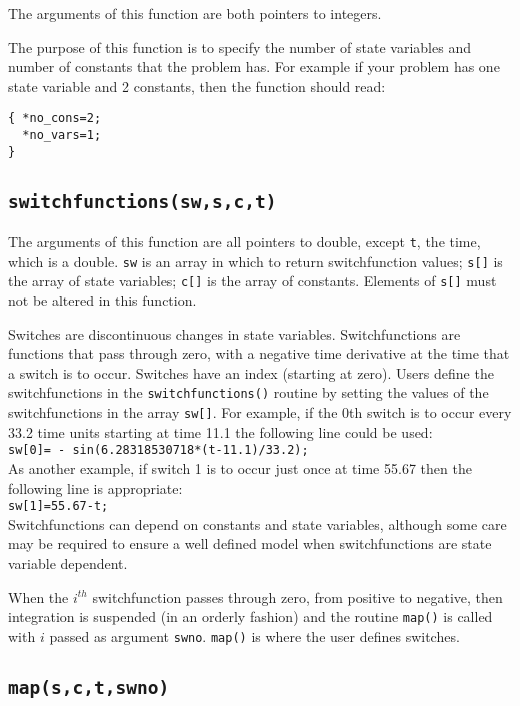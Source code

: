 \documentclass[10pt] {article}
\begin{document}
The arguments of this function are both pointers to integers.

The purpose of this function is to specify the number of state variables and number of constants %
that the problem has. For example if your problem has one state variable and 2 constants, then %
the function should read:
\begin{verbatim}
{ *no_cons=2;
  *no_vars=1;
}
\end{verbatim}

\subsection{\tt switchfunctions(sw,s,c,t)}

The arguments of this function are all pointers to double, except \verb+t+, the time, which is a %
double. \verb+sw+ is an array in which to return switchfunction values; \verb+s[]+ is the array %
of state variables; \verb+c[]+ is the array of constants. Elements of \verb+s[]+ must not be %
altered in this function.

Switches are discontinuous changes in state variables. Switchfunctions are functions that pass %
through zero, with a negative time derivative at the time that a switch is to occur. Switches %
have an index (starting at zero). Users define the switchfunctions in the %
\verb+switchfunctions()+ routine by setting the values of the switchfunctions in the array %
\verb+sw[]+. For example, if the 0th switch is to occur every 33.2 time units starting at time %
11.1 the following line could be used:\\
\verb+sw[0]= - sin(6.28318530718*(t-11.1)/33.2);+\\
As another example, if switch 1 is to occur just once at time 55.67 then the following line is %
appropriate:\\
\verb+sw[1]=55.67-t;+\\
Switchfunctions can depend on constants and state variables, although some care may be required %
to ensure a well defined model when switchfunctions are state variable dependent.

When the $i^{th}$ switchfunction passes through zero, from positive to negative, then integration %
is suspended (in an orderly fashion) and the routine \verb+map()+ is called with $ i$ passed as %
argument \verb+swno+. \verb+map()+ is where the user defines switches.

\subsection{\tt map(s,c,t,swno)}
\end{document}
